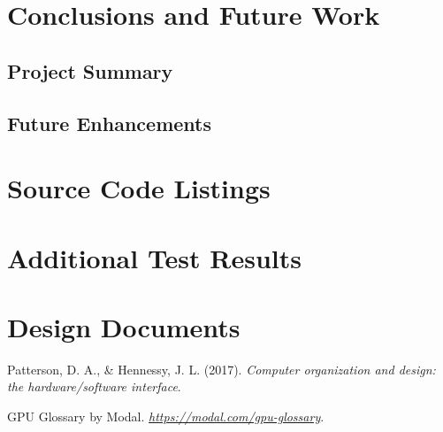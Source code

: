 \documentclass[12pt,letterpaper]{report}
\theoremstyle{definition}
\theoremstyle{plain}
\begin{document}
\chapter{Conclusions and Future Work}

\section{Project Summary}

\section{Future Enhancements}

\appendix

\chapter{Source Code Listings}

\chapter{Additional Test Results}

\chapter{Design Documents}

\begin{thebibliography}{99}

Patterson, D. A., \& Hennessy, J. L. (2017). 
\textit{Computer organization and design: the hardware/software interface}. 

GPU Glossary by Modal.
\textit{\url{https://modal.com/gpu-glossary}}. 


\end{thebibliography}
\end{document}
